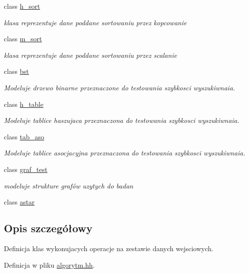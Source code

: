 \begin{DoxyCompactItemize}
class \hyperlink{classh__sort}{h\-\_\-sort}
\begin{DoxyCompactList}\small\item\em klasa reprezentuje dane poddane sortowaniu przez kopcowanie \end{DoxyCompactList}\item 
class \hyperlink{classm__sort}{m\-\_\-sort}
\begin{DoxyCompactList}\small\item\em klasa reprezentuje dane poddane sortowaniu przez scalanie \end{DoxyCompactList}\item 
class \hyperlink{classbst}{bst}
\begin{DoxyCompactList}\small\item\em Modeluje drzewo binarne przeznaczone do testowania szybkosci wyszukiwnaia. \end{DoxyCompactList}\item 
class \hyperlink{classh__table}{h\-\_\-table}
\begin{DoxyCompactList}\small\item\em Modeluje tablice haszujaca przeznaczona do testowania szybkosci wyszukiwnaia. \end{DoxyCompactList}\item 
class \hyperlink{classtab__aso}{tab\-\_\-aso}
\begin{DoxyCompactList}\small\item\em Modeluje tablice asocjacyjna przeznaczona do testowania szybkosci wyszukiwnaia. \end{DoxyCompactList}\item 
class \hyperlink{classgraf__test}{graf\-\_\-test}
\begin{DoxyCompactList}\small\item\em modeluje strukture grafów uzytych do badan \end{DoxyCompactList}\item 
class \hyperlink{classastar}{astar}
\end{DoxyCompactItemize}


\subsection{Opis szczegółowy}
Definicja klas wykonujacych operacje na zestawie danych wejsciowych. 

Definicja w pliku \hyperlink{algorytm_8hh_source}{algorytm.\-hh}.

